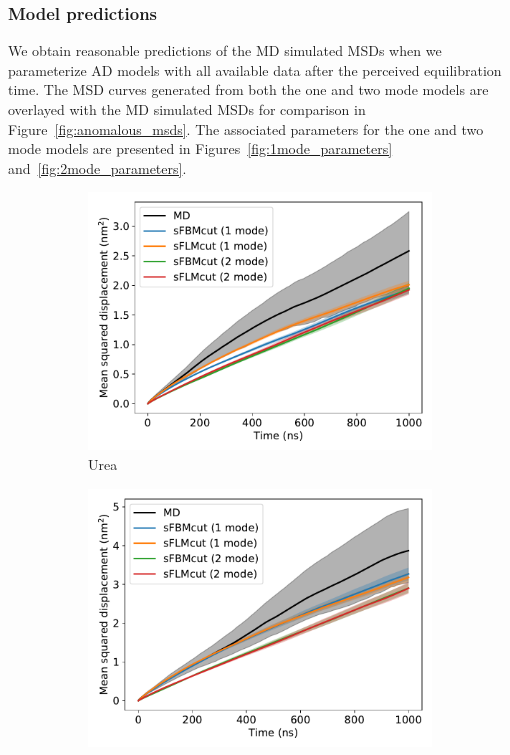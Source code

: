 \documentclass[aps,pre,preprint,groupedaddress,longbibliography]{revtex4-2}
\begin{document}
  \subsubsection{Model predictions}\label{section:AD_all_data}
 
  We obtain reasonable predictions of the MD simulated MSDs when we
  parameterize AD models with all available data after the perceived
  equilibration time. The MSD curves generated from both the one and 
  two mode models are overlayed with the MD simulated MSDs for comparison in
  Figure~\ref{fig:anomalous_msds}. The associated parameters for the one and two
  mode models are presented in Figures~\ref{fig:1mode_parameters}
  and~\ref{fig:2mode_parameters}.
  
  \begin{figure}
  \centering
  \begin{subfigure}{0.45\textwidth}
  \includegraphics[width=\textwidth]{bothmode_msd_comparison_URE.pdf}
  \caption{Urea}\label{fig:bothmode_msd_comparison_URE}
  \end{subfigure}
  \begin{subfigure}{0.45\textwidth}
  \includegraphics[width=\textwidth]{bothmode_msd_comparison_GCL.pdf}

\end{subfigure}
\end{figure}
\end{document}
